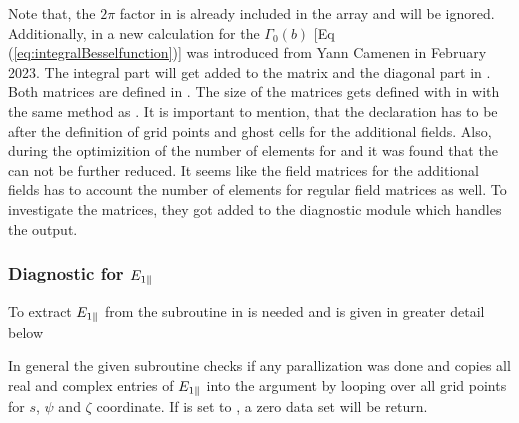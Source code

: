 



Note that, the $2\pi$ factor in  is already included in the array  \cite{GKWManual} and will be ignored. Additionally, in  a new calculation for the $\Gamma_0(b)$ [Eq (\ref{eq:integralBesselfunction})] was introduced from Yann Camenen in February 2023. The integral part will get added to the matrix  and the diagonal part in . Both matrices are defined in . The size of the matrices gets defined with  in  with the same method as . It is important to mention, that the declaration has to be after the definition of grid points and ghost cells for the additional fields. Also, during the optimizition of the number of elements for  and  it was found that the  can not be further reduced. It seems like the field matrices for the additional fields has to account the number of elements for regular field matrices as well. To investigate the matrices, they got added to the diagnostic module  which handles the output.

\subsubsection*{Diagnostic for $E_{1\parallel}$}

To extract $E_{1\parallel}$ from  the subroutine  in  is needed and is given in greater detail below


In general the given subroutine checks if any parallization was done and copies all real and complex entries of $E_{1\parallel}$ into the argument  by looping over all grid points for $s$, $\psi$ and $\zeta$ coordinate. If  is set to , a zero data set will be return.

